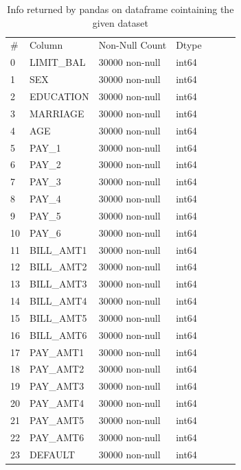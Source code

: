 \documentclass{article}
\begin{document}
\begin{table}[h]
\centering
\begin{tabular}{lllllll}
\# & Column     & Non-Null Count & Dtype &  &  &  \\ \cline{1-4}
0  & LIMIT\_BAL & 30000 non-null & int64 &  &  &  \\
1  & SEX        & 30000 non-null & int64 &  &  &  \\
2  & EDUCATION  & 30000 non-null & int64 &  &  &  \\
3  & MARRIAGE   & 30000 non-null & int64 &  &  &  \\
4  & AGE        & 30000 non-null & int64 &  &  &  \\
5  & PAY\_1     & 30000 non-null & int64 &  &  &  \\
6  & PAY\_2     & 30000 non-null & int64 &  &  &  \\
7  & PAY\_3     & 30000 non-null & int64 &  &  &  \\
8  & PAY\_4     & 30000 non-null & int64 &  &  &  \\
9  & PAY\_5     & 30000 non-null & int64 &  &  &  \\
10 & PAY\_6     & 30000 non-null & int64 &  &  &  \\
11 & BILL\_AMT1 & 30000 non-null & int64 &  &  &  \\
12 & BILL\_AMT2 & 30000 non-null & int64 &  &  &  \\
13 & BILL\_AMT3 & 30000 non-null & int64 &  &  &  \\
14 & BILL\_AMT4 & 30000 non-null & int64 &  &  &  \\
15 & BILL\_AMT5 & 30000 non-null & int64 &  &  &  \\
16 & BILL\_AMT6 & 30000 non-null & int64 &  &  &  \\
17 & PAY\_AMT1  & 30000 non-null & int64 &  &  &  \\
18 & PAY\_AMT2  & 30000 non-null & int64 &  &  &  \\
19 & PAY\_AMT3  & 30000 non-null & int64 &  &  &  \\
20 & PAY\_AMT4  & 30000 non-null & int64 &  &  &  \\
21 & PAY\_AMT5  & 30000 non-null & int64 &  &  &  \\
22 & PAY\_AMT6  & 30000 non-null & int64 &  &  &  \\
23 & DEFAULT    & 30000 non-null & int64 &  &  & 
\end{tabular}
\caption{Info returned by pandas on dataframe cointaining the given dataset}
\end{table}
\end{document}

